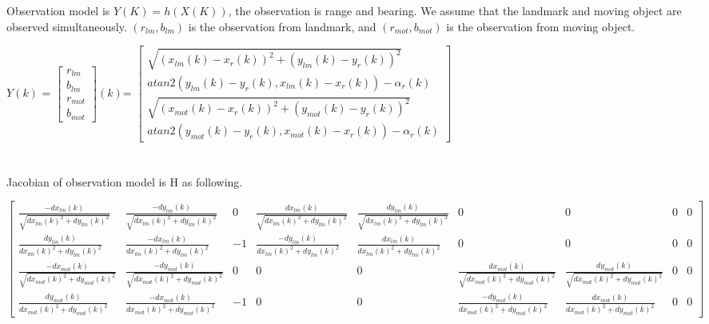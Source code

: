 \documentclass[11pt,a4paper]{article}
\begin{document}
\noindent Observation model is $Y(K) = h(X(K))$, the observation is range and bearing. We assume that the landmark and moving object are observed simultaneously. $(r_{lm}, b_{lm})$ is the observation from landmark, and  $(r_{mot}, b_{mot})$ is the observation from moving object.

\noindent $Y(k)$ = $\begin{bmatrix} r_{lm} \\ b_{lm} \\ r_{mot} \\ b_{mot} \end{bmatrix}(k)$= 
$\begin{bmatrix}  \sqrt{(x_{lm}(k)-x_{r}(k))^2+(y_{lm}(k)-y_{r}(k))^2}\\
					atan2(y_{lm}(k)-y_{r}(k),x_{lm}(k)-x_{r}(k)) -\alpha_{r}(k)\\ 
					\sqrt{(x_{mot}(k)-x_{r}(k))^2+(y_{mot}(k)-y_{r}(k))^2} \\
					atan2(y_{mot}(k)-y_{r}(k),x_{mot}(k)-x_{r}(k)) -\alpha_{r}(k)
\end{bmatrix}$
\\
\\
\\
\noindent Jacobian of observation model is H as following.

\begin{adjustwidth}{ -4 cm}{}
\noindent $\begin{bmatrix} \frac{-dx_{lm}(k)}{\sqrt{dx_{lm}(k)^2+dy_{lm}(k)^2}}  &  \frac{-dy_{lm}(k)}{\sqrt{dx_{lm}(k)^2+dy_{lm}(k)^2}} & 0 & \frac{dx_{lm}(k)}{\sqrt{dx_{lm}(k)^2+dy_{lm}(k)^2}}  &  \frac{dy_{lm}(k)}{\sqrt{dx_{lm}(k)^2+dy_{lm}(k)^2}} & 0 & 0 & 0 & 0\\
		  \frac{ dy_{lm}(k)}{ dx_{lm}(k)^2+dy_{lm}(k)^2 }  &   \frac{-dx_{lm}(k)}{ dx_{lm}(k)^2+dy_{lm}(k)^2 }   &  -1  &   \frac{ -dy_{lm}(k)}{ dx_{lm}(k)^2+dy_{lm}(k)^2 }  &  \frac{dx_{lm}(k)}{ dx_{lm}(k)^2+dy_{lm}(k)^2 }  &  0  &  0 &  0 &  0 \\
							\frac{-dx_{mot}(k)}{\sqrt{dx_{mot}(k)^2+dy_{mot}(k)^2}}  &  \frac{-dy_{mot}(k)}{\sqrt{dx_{mot}(k)^2+dy_{mot}(k)^2}}  &  0  &  0  &  0  &  \frac{dx_{mot}(k)}{\sqrt{dx_{mot}(k)^2+dy_{mot}(k)^2}}  &  \frac{dy_{mot}(k)}{\sqrt{dx_{mot}(k)^2+dy_{mot}(k)^2}} &  0 &  0 \\
							  \frac{ dy_{mot}(k)}{ dx_{mot}(k)^2+dy_{mot}(k)^2 }  &  \frac{ -dx_{mot}(k)}{ dx_{mot}(k)^2+dy_{mot}(k)^2 }  &  -1  &  0  &  0  &  \frac{-dy_{mot}(k)}{ dx_{mot}(k)^2+dy_{mot}(k)^2 } &  \frac{ dx_{mot}(k)}{ dx_{mot}(k)^2+dy_{mot}(k)^2 } &  0 &  0 
\end{bmatrix}$ 
\end{adjustwidth}
\end{document}
